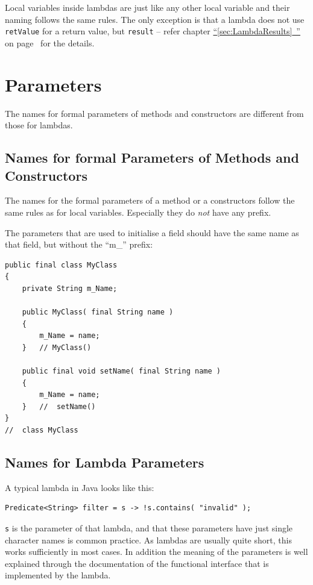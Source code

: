 \documentclass[11pt,a4paper, titlepage, parskip=half, headsepline, footsepline, cleardoublepage=current, headheight=1cm]{scrbook}
\newcommand*{\tqfullvref}[1]{\hyperref[{#1}]{“\ref*{#1}~\nameref*{#1}”} on page~\pageref{#1}}
\begin{document}
Local variables inside lambdas are just like any other local variable and their naming follows the same rules. The only exception is that a lambda does not use \lstinline|retValue| for a return value, but \lstinline|result| – refer chapter \tqfullvref{sec:LambdaResults} for the details.

\section{Parameters}
The names for formal parameters of methods and constructors are different from those for lambdas.

\subsection{Names for formal Parameters of Methods and Constructors}\label{sec:NamesForFormalParameters}
The names for the formal parameters of a method or a constructors follow the same rules as for local variables. Especially they do \textit{not} have any prefix.

The parameters that are used to initialise a field should have the same name as that field, but without the “m\_” prefix:
\begin{lstlisting}
public final class MyClass
{
    private String m_Name;
    
    public MyClass( final String name )
    {
        m_Name = name;
    }   // MyClass()
    
    public final void setName( final String name )
    {
        m_Name = name;
    }   //  setName()
}
//  class MyClass
\end{lstlisting}

\subsection{Names for Lambda Parameters}\label{sec:NamesForLambdaParameters}
A typical lambda in Java looks like this:
\begin{lstlisting}
Predicate<String> filter = s -> !s.contains( "invalid" );
\end{lstlisting}
\lstinline|s| is the parameter of that lambda, and that these parameters have just single character names is common practice. As lambdas are usually quite short, this works sufficiently in most cases. In addition the meaning of the parameters is well explained through the documentation of the functional interface that is implemented by the lambda.
\end{document}
